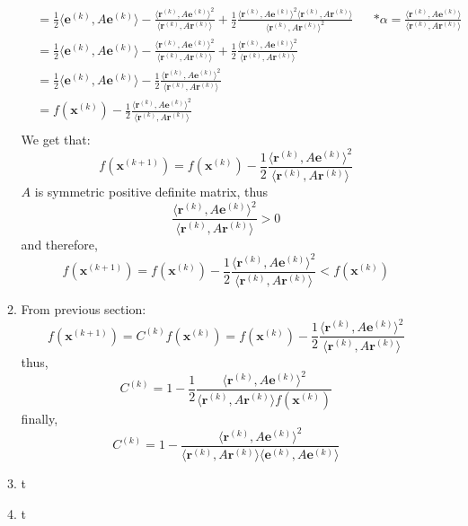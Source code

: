 \documentclass{article}
\begin{document}
\begin{enumerate}[(a)]
\begin{enumerate}[label=(\roman*)]
\begin{align*}
&= \frac{1}{2}\langle\mathbf{e}^{(k)}, A\mathbf{e}^{(k)}\rangle - \frac{\langle\mathbf{r}^{(k)}, A\mathbf{e}^{(k)}\rangle^2}{\langle\mathbf{r}^{(k)}, A\mathbf{r}^{(k)}\rangle} + \frac{1}{2}\frac{\langle\mathbf{r}^{(k)}, A\mathbf{e}^{(k)}\rangle^2\langle\mathbf{r}^{(k)}, A\mathbf{r}^{(k)}\rangle}{\langle\mathbf{r}^{(k)}, A\mathbf{r}^{(k)}\rangle^2} && *\alpha = \frac{\langle\mathbf{r}^{(k)}, A\mathbf{e}^{(k)}\rangle}{\langle\mathbf{r}^{(k)}, A\mathbf{r}^{(k)}\rangle}\\
&= \frac{1}{2}\langle\mathbf{e}^{(k)}, A\mathbf{e}^{(k)}\rangle - \frac{\langle\mathbf{r}^{(k)}, A\mathbf{e}^{(k)}\rangle^2}{\langle\mathbf{r}^{(k)}, A\mathbf{r}^{(k)}\rangle} + \frac{1}{2}\frac{\langle\mathbf{r}^{(k)}, A\mathbf{e}^{(k)}\rangle^2}{\langle\mathbf{r}^{(k)}, A\mathbf{r}^{(k)}\rangle}\\
&= \frac{1}{2}\langle\mathbf{e}^{(k)}, A\mathbf{e}^{(k)}\rangle - \frac{1}{2}\frac{\langle\mathbf{r}^{(k)}, A\mathbf{e}^{(k)}\rangle^2}{\langle\mathbf{r}^{(k)}, A\mathbf{r}^{(k)}\rangle}\\
&= f(\mathbf{x}^{(k)}) - \frac{1}{2}\frac{\langle\mathbf{r}^{(k)}, A\mathbf{e}^{(k)}\rangle^2}{\langle\mathbf{r}^{(k)}, A\mathbf{r}^{(k)}\rangle}\\
\end{align*}
We get that:
\[f(\mathbf{x}^{(k+1)}) = f(\mathbf{x}^{(k)}) - \frac{1}{2}\frac{\langle\mathbf{r}^{(k)}, A\mathbf{e}^{(k)}\rangle^2}{\langle\mathbf{r}^{(k)}, A\mathbf{r}^{(k)}\rangle}\]
$A$ is symmetric positive definite matrix, thus
\[\frac{\langle\mathbf{r}^{(k)}, A\mathbf{e}^{(k)}\rangle^2}{\langle\mathbf{r}^{(k)}, A\mathbf{r}^{(k)}\rangle}>0\]
and therefore,
\[f(\mathbf{x}^{(k+1)}) = f(\mathbf{x}^{(k)}) - \frac{1}{2}\frac{\langle\mathbf{r}^{(k)}, A\mathbf{e}^{(k)}\rangle^2}{\langle\mathbf{r}^{(k)}, A\mathbf{r}^{(k)}\rangle} <  f(\mathbf{x}^{(k)})\]
\item From previous section:
\[f(\mathbf{x}^{(k+1)}) = C^{(k)} f(\mathbf{x}^{(k)}) = f(\mathbf{x}^{(k)}) - \frac{1}{2}\frac{\langle\mathbf{r}^{(k)}, A\mathbf{e}^{(k)}\rangle^2}{\langle\mathbf{r}^{(k)}, A\mathbf{r}^{(k)}\rangle} \]
thus,
\[C^{(k)} = 1- \frac{1}{2}\frac{\langle\mathbf{r}^{(k)}, A\mathbf{e}^{(k)}\rangle^2}{\langle\mathbf{r}^{(k)}, A\mathbf{r}^{(k)}\rangle f(\mathbf{x}^{(k)})}\]
finally,
\[C^{(k)} = 1- \frac{\langle\mathbf{r}^{(k)}, A\mathbf{e}^{(k)}\rangle^2}{\langle\mathbf{r}^{(k)}, A\mathbf{r}^{(k)}\rangle \langle \mathbf{e}^{(k)}, A\mathbf{e}^{(k)}\rangle}\]
\item t
\item t
\end{enumerate}
\end{enumerate}
\end{document}
